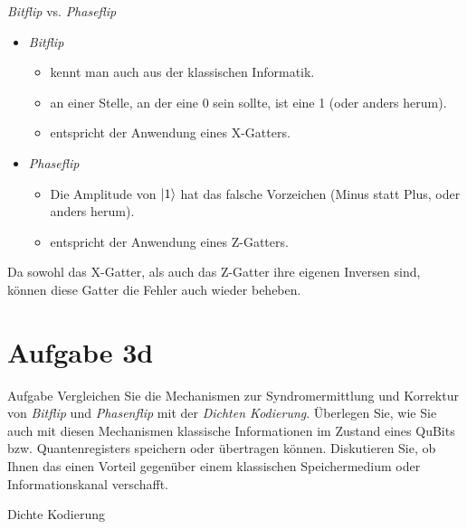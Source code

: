 \documentclass[fleqn,compress,utf8,aspectratio=169,t]{beamer}
\begin{document}
\begin{frame}{\textit{Bitflip} vs. \textit{Phaseflip}}
\begin{itemize}
	\item \textit{Bitflip}
	\begin{itemize}
		\item kennt man auch aus der klassischen Informatik.
		\item an einer Stelle, an der eine 0 sein sollte, ist eine 1 (oder anders herum).
		\item entspricht der Anwendung eines X-Gatters.
	\end{itemize}
	\item \textit{Phaseflip}
	\begin{itemize}
		\item Die Amplitude von $\ket{1}$ hat das falsche Vorzeichen (Minus statt Plus, oder anders herum).
		\item entspricht der Anwendung eines Z-Gatters.
	\end{itemize}
\end{itemize}
Da sowohl das X-Gatter, als auch das Z-Gatter ihre eigenen Inversen sind, können diese Gatter die Fehler auch wieder beheben.
\end{frame}

\section{Aufgabe 3d}

\begin{frame}{Aufgabe}
Vergleichen Sie die Mechanismen zur Syndromermittlung und Korrektur von \textit{Bitflip} und \textit{Phasenflip} mit der \textit{Dichten Kodierung}. Überlegen Sie, wie Sie auch mit diesen Mechanismen klassische Informationen im Zustand eines QuBits bzw. Quantenregisters speichern oder übertragen können. Diskutieren Sie, ob Ihnen das einen Vorteil gegenüber einem klassischen Speichermedium oder Informationskanal verschafft.
\end{frame}

\begin{frame}{Dichte Kodierung}
\end{frame}
\end{document}
